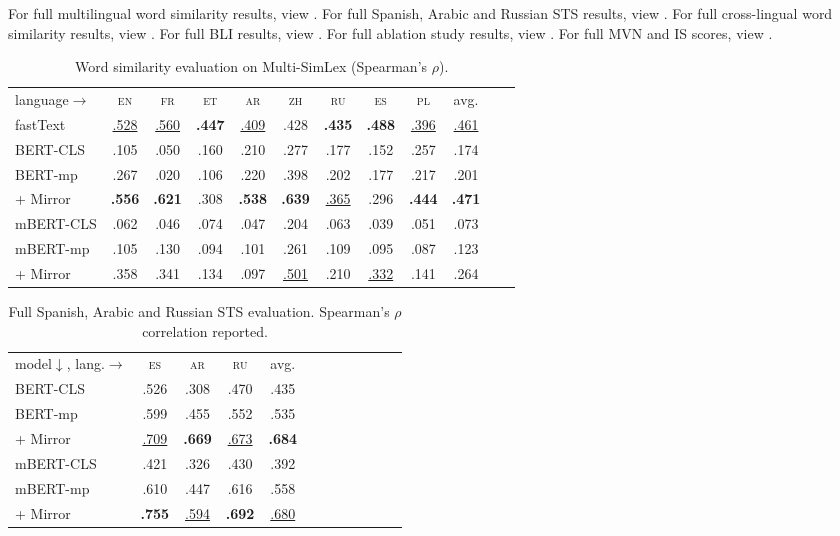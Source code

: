 \documentclass[11pt]{article}
\newcommand{\en}{{\textsc{en}}\xspace}
\newcommand{\es}{{\textsc{es}}\xspace}
\newcommand{\zh}{{\textsc{zh}}\xspace}
\newcommand{\ru}{{\textsc{ru}}\xspace}
\newcommand{\fr}{{\textsc{fr}}\xspace}
\newcommand{\et}{{\textsc{et}}\xspace}
\newcommand{\pl}{{\textsc{pl}}\xspace}
\newcommand{\ar}{{\textsc{ar}}\xspace}
\begin{document}
For full multilingual word similarity results, view . 
For full Spanish, Arabic and Russian STS results, view . For full cross-lingual word similarity results, view . For full BLI results, view . For full ablation study results, view . For full MVN and IS scores, view . 


\begin{table*}[] \centering
\small
\begin{tabular}{lccccccccccc}
\cmidrule[1.0pt]{1-10}
language$\rightarrow$ & \en & \fr & \et & \ar & \zh & \ru & \es & \pl & avg. \\
\cmidrule[1.0pt]{1-10}
fastText & \underline{.528} & \underline{.560} & \textbf{.447} & \underline{.409} & .428 & \textbf{.435} & \textbf{.488} & \underline{.396} & \underline{.461} \\
\cmidrule[1.0pt]{1-10}
BERT-CLS & .105 & .050 &.160 & .210 & .277 & .177 & .152 & .257 & .174 \\
BERT-mp & .267 & .020 &.106 & .220 & .398 & .202 & .177 & .217 & .201 \\
\rowcolor{blue!10}
+ Mirror  & \textbf{.556} & \textbf{.621} & .308 & \textbf{.538} & \textbf{.639} & \underline{.365} & .296 & \textbf{.444} & \textbf{.471} \\
\cmidrule[1.0pt]{1-10}
mBERT-CLS & .062 & .046 & .074 & .047 & .204 & .063 & .039 & .051 & .073 \\
mBERT-mp & .105 & .130 &.094 & .101 & .261 & .109 & .095 & .087 & .123 \\
\rowcolor{blue!10}
+ Mirror & .358 & .341 & .134 & .097 & \underline{.501} & .210 & \underline{.332} & .141 & .264 \\
\cmidrule[1.0pt]{1-10}
\end{tabular}
\caption{Word similarity evaluation on Multi-SimLex (Spearman's $\rho$).}
\label{tab:ws_full}
\end{table*}





\begin{table*}[!t]
\centering
\small
\begin{tabular}{lccccccccccc}
\cmidrule[1.0pt]{1-10}
model$\downarrow$, lang.$\rightarrow$  & \es & \ar & \ru & avg. \\
\cmidrule[1.0pt]{1-10}
BERT-CLS & .526 & .308 & .470 & .435 \\
BERT-mp & .599 & .455 & .552 & .535 \\
\rowcolor{blue!10}
+ Mirror & \underline{.709} & \textbf{.669} & \underline{.673} & \textbf{.684} \\
\cmidrule[1.0pt]{1-10}
mBERT-CLS & .421 & .326 & .430 & .392 \\
mBERT-mp & .610 & .447 & .616 & .558 \\
\rowcolor{blue!10}
 + Mirror & \textbf{.755} & \underline{.594} & \textbf{.692} & \underline{.680}\\
\cmidrule[1.0pt]{1-10}
\end{tabular}
\caption{Full Spanish, Arabic and Russian STS evaluation. Spearman's $\rho$ correlation reported.}
\label{tab:sts_multillingual_full}
\end{table*}
\end{document}
